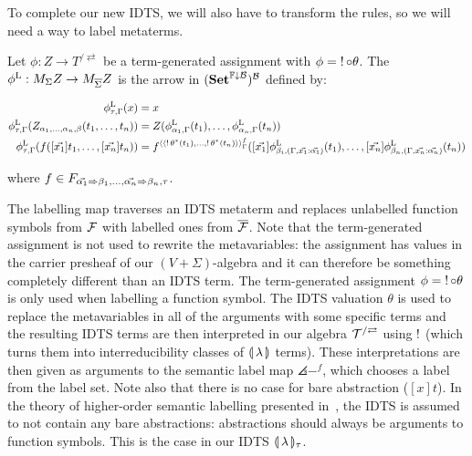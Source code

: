 To complete our new IDTS, we will also have to transform the rules, so we
will need a way to label metaterms.

\begin{definition}
  Let $\phi : Z \to T^{/\rightleftarrows}$ be a term-generated assignment
  with $\phi = \mathop{!} {\mathbin{\circ}} \theta$. The 
  $\phi^{\mathrm{L}} : M_\Sigma Z \to M_{\overline{\Sigma}} Z$ is the arrow in
  $(\mathbf{Set}^{\mathbb{F}\downarrow\mathcal{B}})^{\mathcal{B}}$ defined by:
  
  \begin{align*}
    \phi^{\mathrm{L}}_{\tau,\Gamma}(x) &= x \\
    \phi^{\mathrm{L}}_{\tau,\Gamma}(Z_{\alpha_1,\ldots,\alpha_n,\beta}(t_1, \ldots, t_n))
    &= Z(\phi^{\mathrm{L}}_{\alpha_1,\Gamma}(t_1), \ldots, \phi^{\mathrm{L}}_{\alpha_n,\Gamma}(t_n)) \\
    \phi^{\mathrm{L}}_{\tau,\Gamma}(f([\vec{x_1}] t_1, \ldots, [\vec{x_n}] t_n))
    &= f^{\langle\langle\mathop{!}\theta^*(t_1), \ldots, \mathop{!}\theta^*(t_n)\rangle\rangle^f_\Gamma}([\vec{x_1}] \phi^{\mathrm{L}}_{\beta_i,(\Gamma,\vec{x_1} :
      \vec{\alpha_1})}(t_1), \ldots,
      [\vec{x_n}] \phi^{\mathrm{L}}_{\beta_n,(\Gamma,\vec{x_n} : \vec{\alpha_n})}(t_n))
  \end{align*}

  where
  $f \in F_{\vec{\alpha_1} \Rightarrow \beta_1, \ldots, \vec{\alpha_n} \Rightarrow \beta_n,
    \tau}$.
\end{definition}

The labelling map traverses an IDTS metaterm and replaces unlabelled
function symbols from $\mathcal{F}$ with labelled ones from $\overline{\mathcal{F}}$.  Note
that the term-generated assignment is not used to rewrite the
metavariables: the assignment has values in the carrier presheaf of our
$(V+\Sigma)$-algebra and it can therefore be something completely different
than an IDTS term. The term-generated assignment
$\phi = \mathop{!} {\mathbin{\circ}} \theta$ is only used when labelling a function
symbol. The IDTS valuation $\theta$ is used to replace the metavariables in
all of the arguments with some specific terms and the resulting IDTS terms
are then interpreted in our algebra $\mathcal{T}^{/\rightleftarrows}$ using
$\mathop{!}$ (which turns them into interreducibility classes of ${\llparenthesis \, \lambda \, \rrparenthesis}$
terms). These interpretations are then given as arguments to the semantic
label map $\angles{-}^f$, which chooses a label from the label set. Note
also that there is no case for bare abstraction ($[x] t$). In the theory of
higher-order semantic labelling presented in~\cite{hamana2007higher}, the
IDTS is assumed to not contain any bare abstractions: abstractions should
always be arguments to function symbols. This is the case in our IDTS
$\llparenthesis \, \lambda \, \rrparenthesis_\tau$.

